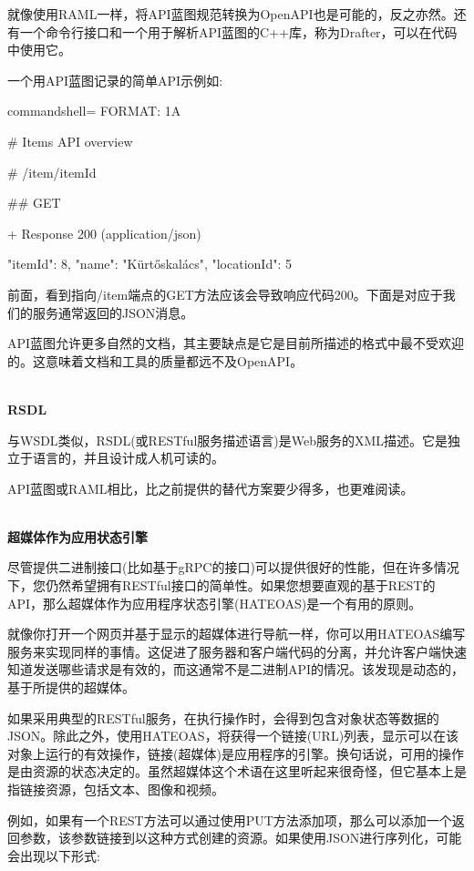 就像使用RAML一样，将API蓝图规范转换为OpenAPI也是可能的，反之亦然。还有一个命令行接口和一个用于解析API蓝图的C++库，称为Drafter，可以在代码中使用它。

一个用API蓝图记录的简单API示例如:

\begin{tcblisting}{commandshell={}}
FORMAT: 1A

# Items API overview

# /item/{itemId}

## GET

+ Response 200 (application/json)

    {
      "itemId": 8,
      "name": "Kürtőskalács",
      "locationId": 5
    }
\end{tcblisting}

前面，看到指向/item端点的GET方法应该会导致响应代码200。下面是对应于我们的服务通常返回的JSON消息。

API蓝图允许更多自然的文档，其主要缺点是它是目前所描述的格式中最不受欢迎的。这意味着文档和工具的质量都远不及OpenAPI。

\hspace*{\fill} \\ %
\noindent
\textbf{RSDL}

与WSDL类似，RSDL(或RESTful服务描述语言)是Web服务的XML描述。它是独立于语言的，并且设计成人机可读的。

API蓝图或RAML相比，比之前提供的替代方案要少得多，也更难阅读。

\hspace*{\fill} \\ %
\noindent
\textbf{超媒体作为应用状态引擎}

尽管提供二进制接口(比如基于gRPC的接口)可以提供很好的性能，但在许多情况下，您仍然希望拥有RESTful接口的简单性。如果您想要直观的基于REST的API，那么超媒体作为应用程序状态引擎(HATEOAS)是一个有用的原则。

就像你打开一个网页并基于显示的超媒体进行导航一样，你可以用HATEOAS编写服务来实现同样的事情。这促进了服务器和客户端代码的分离，并允许客户端快速知道发送哪些请求是有效的，而这通常不是二进制API的情况。该发现是动态的，基于所提供的超媒体。

如果采用典型的RESTful服务，在执行操作时，会得到包含对象状态等数据的JSON。除此之外，使用HATEOAS，将获得一个链接(URL)列表，显示可以在该对象上运行的有效操作，链接(超媒体)是应用程序的引擎。换句话说，可用的操作是由资源的状态决定的。虽然超媒体这个术语在这里听起来很奇怪，但它基本上是指链接资源，包括文本、图像和视频。

例如，如果有一个REST方法可以通过使用PUT方法添加项，那么可以添加一个返回参数，该参数链接到以这种方式创建的资源。如果使用JSON进行序列化，可能会出现以下形式:

